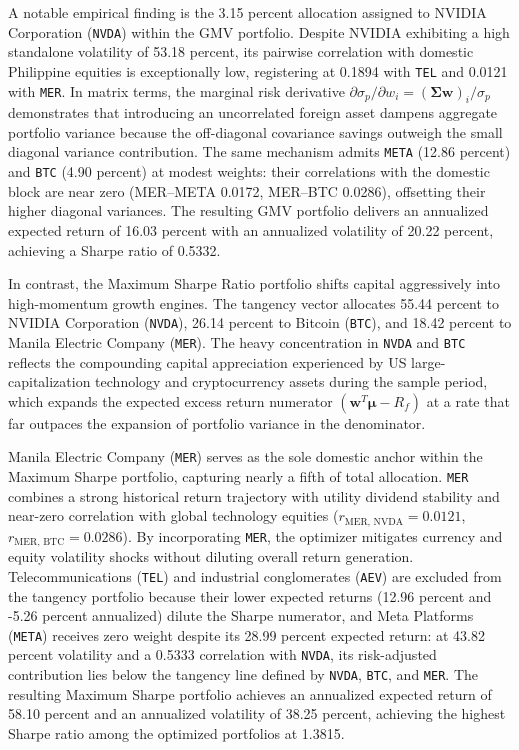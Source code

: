 A notable empirical finding is the 3.15 percent allocation assigned to NVIDIA Corporation (\texttt{NVDA}) within the GMV portfolio. Despite NVIDIA exhibiting a high standalone volatility of 53.18 percent, its pairwise correlation with domestic Philippine equities is exceptionally low, registering at 0.1894 with \texttt{TEL} and 0.0121 with \texttt{MER}. In matrix terms, the marginal risk derivative $\partial \sigma_p / \partial w_i = (\boldsymbol{\Sigma} \mathbf{w})_i / \sigma_p$ demonstrates that introducing an uncorrelated foreign asset dampens aggregate portfolio variance because the off-diagonal covariance savings outweigh the small diagonal variance contribution. The same mechanism admits \texttt{META} (12.86 percent) and \texttt{BTC} (4.90 percent) at modest weights: their correlations with the domestic block are near zero (MER--META 0.0172, MER--BTC 0.0286), offsetting their higher diagonal variances. The resulting GMV portfolio delivers an annualized expected return of 16.03 percent with an annualized volatility of 20.22 percent, achieving a Sharpe ratio of 0.5332.

In contrast, the Maximum Sharpe Ratio portfolio shifts capital aggressively into high-momentum growth engines. The tangency vector allocates 55.44 percent to NVIDIA Corporation (\texttt{NVDA}), 26.14 percent to Bitcoin (\texttt{BTC}), and 18.42 percent to Manila Electric Company (\texttt{MER}). The heavy concentration in \texttt{NVDA} and \texttt{BTC} reflects the compounding capital appreciation experienced by US large-capitalization technology and cryptocurrency assets during the sample period, which expands the expected excess return numerator $(\mathbf{w}^T \boldsymbol{\mu} - R_f)$ at a rate that far outpaces the expansion of portfolio variance in the denominator.

Manila Electric Company (\texttt{MER}) serves as the sole domestic anchor within the Maximum Sharpe portfolio, capturing nearly a fifth of total allocation. \texttt{MER} combines a strong historical return trajectory with utility dividend stability and near-zero correlation with global technology equities ($r_{\text{MER, NVDA}} = 0.0121$, $r_{\text{MER, BTC}} = 0.0286$). By incorporating \texttt{MER}, the optimizer mitigates currency and equity volatility shocks without diluting overall return generation. Telecommunications (\texttt{TEL}) and industrial conglomerates (\texttt{AEV}) are excluded from the tangency portfolio because their lower expected returns (12.96 percent and -5.26 percent annualized) dilute the Sharpe numerator, and Meta Platforms (\texttt{META}) receives zero weight despite its 28.99 percent expected return: at 43.82 percent volatility and a 0.5333 correlation with \texttt{NVDA}, its risk-adjusted contribution lies below the tangency line defined by \texttt{NVDA}, \texttt{BTC}, and \texttt{MER}. The resulting Maximum Sharpe portfolio achieves an annualized expected return of 58.10 percent and an annualized volatility of 38.25 percent, achieving the highest Sharpe ratio among the optimized portfolios at 1.3815.

